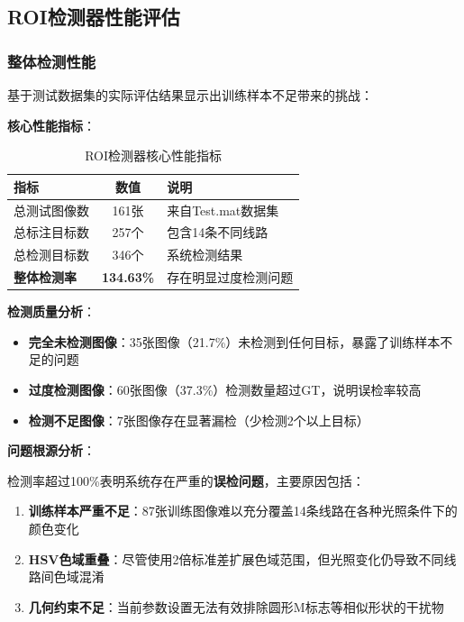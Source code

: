 \documentclass[12pt,a4paper]{article}
\begin{document}
\subsection{ROI检测器性能评估}

\subsubsection{整体检测性能}

基于测试数据集的实际评估结果显示出训练样本不足带来的挑战：

\textbf{核心性能指标}：

\begin{table}[H]
    \centering
    \begin{tabular}{|l|c|l|}
        \hline
        \textbf{指标} & \textbf{数值} & \textbf{说明} \\
        \hline
        总测试图像数 & 161张 & 来自Test.mat数据集 \\
        总标注目标数 & 257个 & 包含14条不同线路 \\
        总检测目标数 & 346个 & 系统检测结果 \\
        \textbf{整体检测率} & \textbf{134.63\%} & 存在明显过度检测问题 \\
        \hline
    \end{tabular}
    \caption{ROI检测器核心性能指标}
    \label{tab:roi_performance}
\end{table}

\textbf{检测质量分析}：
\begin{itemize}
    \item \textbf{完全未检测图像}：35张图像（21.7\%）未检测到任何目标，暴露了训练样本不足的问题
    \item \textbf{过度检测图像}：60张图像（37.3\%）检测数量超过GT，说明误检率较高
    \item \textbf{检测不足图像}：7张图像存在显著漏检（少检测2个以上目标）
\end{itemize}

\textbf{问题根源分析}：

检测率超过100\%表明系统存在严重的\textbf{误检问题}，主要原因包括：
\begin{enumerate}
    \item \textbf{训练样本严重不足}：87张训练图像难以充分覆盖14条线路在各种光照条件下的颜色变化
    \item \textbf{HSV色域重叠}：尽管使用2倍标准差扩展色域范围，但光照变化仍导致不同线路间色域混淆
    \item \textbf{几何约束不足}：当前参数设置无法有效排除圆形M标志等相似形状的干扰物
\end{enumerate}
\end{document}
